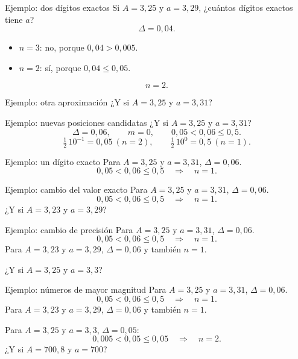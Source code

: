 \documentclass[main.tex]{subfiles}
\begin{document}
\begin{frame}{Ejemplo: dos dígitos exactos}
Si $A=3{,}25$ y $a=3{,}29$, ¿cuántos dígitos exactos tiene $a$?\[\Delta=0{,}04.\]\begin{itemize}\item $n=3$: no, porque $0{,}04>0{,}005$.\item $n=2$: sí, porque $0{,}04\le0{,}05$.\end{itemize}\[\boxed{n=2.}\]
\end{frame}

\begin{frame}{Ejemplo: otra aproximación}
¿Y si $A=3{,}25$ y $a=3{,}31$?
\end{frame}

\begin{frame}{Ejemplo: nuevas posiciones candidatas}
¿Y si $A=3{,}25$ y $a=3{,}31$?\[\Delta=0{,}06,\qquad m=0,\qquad0{,}05<0{,}06\le0{,}5.\]\[\tfrac12\,10^{-1}=0{,}05\ (n=2),\qquad\tfrac12\,10^0=0{,}5\ (n=1).\]
\end{frame}

\begin{frame}{Ejemplo: un dígito exacto}
Para $A=3{,}25$ y $a=3{,}31$, $\Delta=0{,}06$.\[0{,}05<0{,}06\le0{,}5\quad\Longrightarrow\quad\boxed{n=1}.\]
\end{frame}

\begin{frame}{Ejemplo: cambio del valor exacto}
Para $A=3{,}25$ y $a=3{,}31$, $\Delta=0{,}06$.\[0{,}05<0{,}06\le0{,}5\quad\Longrightarrow\quad\boxed{n=1}.\]\medskip ¿Y si $A=3{,}23$ y $a=3{,}29$?
\end{frame}

\begin{frame}{Ejemplo: cambio de precisión}
Para $A=3{,}25$ y $a=3{,}31$, $\Delta=0{,}06$.\[0{,}05<0{,}06\le0{,}5\quad\Longrightarrow\quad\boxed{n=1}.\]Para $A=3{,}23$ y $a=3{,}29$, $\Delta=0{,}06$ y también $n=1$.\par\medskip ¿Y si $A=3{,}25$ y $a=3{,}3$?
\end{frame}

\begin{frame}{Ejemplo: números de mayor magnitud}
\small Para $A=3{,}25$ y $a=3{,}31$, $\Delta=0{,}06$.\[0{,}05<0{,}06\le0{,}5\quad\Longrightarrow\quad\boxed{n=1}.\]Para $A=3{,}23$ y $a=3{,}29$, $\Delta=0{,}06$ y también $n=1$.\par\medskip Para $A=3{,}25$ y $a=3{,}3$, $\Delta=0{,}05$:\[0{,}005<0{,}05\le0{,}05\quad\Longrightarrow\quad n=2.\]¿Y si $A=700{,}8$ y $a=700$?
\end{frame}
\end{document}
